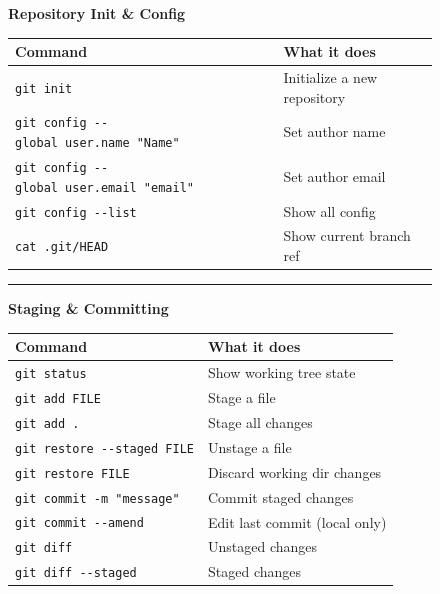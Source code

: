 \documentclass[
  9pt,
  a4paper,
  DIV=11,
  numbers=noendperiod]{scrartcl}
\begin{document}
\begin{figure}
\begin{minipage}{0.50\linewidth}
\end{minipage}%
%
\begin{minipage}{0.50\linewidth}
\textbf{Repository Init \& Config}\end{minipage}%
\newline
\begin{minipage}{0.50\linewidth}

\begin{longtable}[]{@{}ll@{}}
\toprule\noalign{}
Command & What it does \\
\midrule\noalign{}
\endhead
\bottomrule\noalign{}
\endlastfoot
\texttt{git\ init} & Initialize a new repository \\
\texttt{git\ config\ -\/-global\ user.name\ "Name"} & Set author name \\
\texttt{git\ config\ -\/-global\ user.email\ "email"} & Set author
email \\
\texttt{git\ config\ -\/-list} & Show all config \\
\texttt{cat\ .git/HEAD} & Show current branch ref \\
\end{longtable}

\end{minipage}%
%
\begin{minipage}{0.50\linewidth}

\begin{center}\rule{0.5\linewidth}{0.5pt}\end{center}

\end{minipage}%
\newline
\begin{minipage}{0.50\linewidth}
\textbf{Staging \& Committing}\end{minipage}%
%
\begin{minipage}{0.50\linewidth}

\begin{longtable}[]{@{}ll@{}}
\toprule\noalign{}
Command & What it does \\
\midrule\noalign{}
\endhead
\bottomrule\noalign{}
\endlastfoot
\texttt{git\ status} & Show working tree state \\
\texttt{git\ add\ FILE} & Stage a file \\
\texttt{git\ add\ .} & Stage all changes \\
\texttt{git\ restore\ -\/-staged\ FILE} & Unstage a file \\
\texttt{git\ restore\ FILE} & Discard working dir changes \\
\texttt{git\ commit\ -m\ "message"} & Commit staged changes \\
\texttt{git\ commit\ -\/-amend} & Edit last commit (local only) \\
\texttt{git\ diff} & Unstaged changes \\
\texttt{git\ diff\ -\/-staged} & Staged changes \\
\end{longtable}


\end{minipage}
\end{figure}
\end{document}
